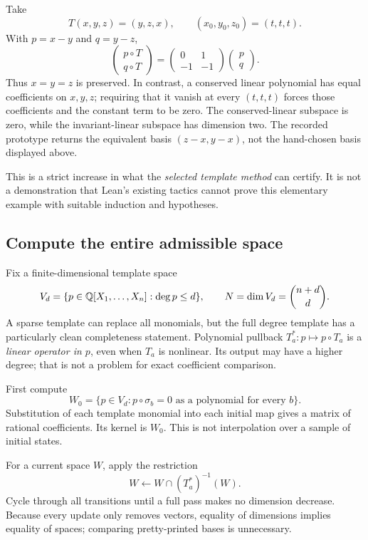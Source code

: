 \begin{example}
\label{ex:cycle}
Take
\[
 T(x,y,z)=(y,z,x),\qquad (x_0,y_0,z_0)=(t,t,t).
\]
With $p=x-y$ and $q=y-z$,
\[
 \begin{pmatrix}p\circ T\\q\circ T\end{pmatrix}
 =\begin{pmatrix}0&1\\-1&-1\end{pmatrix}
  \begin{pmatrix}p\\q\end{pmatrix}.
\]
Thus $x=y=z$ is preserved. In contrast, a conserved linear polynomial has equal
coefficients on $x,y,z$; requiring that it vanish at every $(t,t,t)$ forces
those coefficients and the constant term to be zero. The conserved-linear
subspace is zero, while the invariant-linear subspace has dimension two.
The recorded prototype returns the equivalent basis $(z-x,y-x)$, not the
hand-chosen basis displayed above.
\end{example}

This is a strict increase in what the \emph{selected template method} can
certify. It is not a demonstration that Lean's existing tactics cannot prove
this elementary example with suitable induction and hypotheses.

\subsection{Compute the entire admissible space}
Fix a finite-dimensional template space
\[
 V_d=\{p\in\mathbb{Q}[X_1,\ldots,X_n]:\operatorname{deg} p\le d\},
 \qquad N=\dim V_d=\binom{n+d}{d}.
\]
A sparse template can replace all monomials, but the full degree template has
a particularly clean completeness statement. Polynomial pullback
$T_a^*:p\mapsto p\circ T_a$ is a \emph{linear operator in $p$}, even when
$T_a$ is nonlinear. Its output may have a higher degree; that is not a problem
for exact coefficient comparison.

First compute
\[
 W_0=\{p\in V_d:p\circ\sigma_b=0\text{ as a polynomial for every }b\}.
\]
Substitution of each template monomial into each initial map gives a matrix of
rational coefficients. Its kernel is $W_0$. This is not interpolation over a
sample of initial states.

For a current space $W$, apply the restriction
\begin{equation}
\label{eq:constant-restriction}
 W\longleftarrow W\cap (T_a^*)^{-1}(W).
\end{equation}
Cycle through all transitions until a full pass makes no dimension decrease.
Because every update only removes vectors, equality of dimensions implies
equality of spaces; comparing pretty-printed bases is unnecessary.

